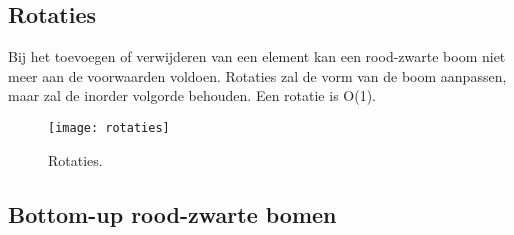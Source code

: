 \documentclass{report}
\begin{document}
	\subsection{Rotaties}
	Bij het toevoegen of verwijderen van een element kan een rood-zwarte boom niet meer aan de voorwaarden voldoen. Rotaties zal de vorm van de boom aanpassen, maar zal de inorder volgorde behouden. Een rotatie is O(1).
   	\begin{figure}[h]
	   	\centering
	   	\texttt{[image: rotaties]}
	   	\caption{Rotaties.}
	   	\label{fig:rotaties}
    \end{figure}
	
	\subsection{Bottom-up rood-zwarte bomen}
\end{document}
